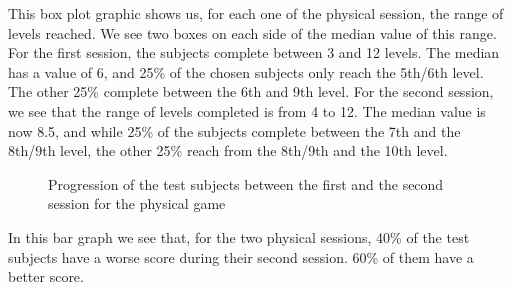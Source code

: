 \documentclass[12pt, openany, twocolumn]{article}
\begin{document}
            This box plot graphic shows us, for each one of the physical session, the range of levels reached. We see two boxes on each side of the median value of this range.
            For the first session, the subjects complete between 3 and 12 levels. The median has a value of 6, and 25\% of the chosen subjects only reach the 5th/6th level. The other 25\% complete between the 6th and 9th level.
            For the second session, we see that the range of levels completed is from 4 to 12. The median value is now 8.5, and while 25\% of the subjects complete between the 7th and the 8th/9th level, the other 25\% reach from the 8th/9th and the 10th level.
                
                \begin{figure}[H]
                    \setlength{\fboxsep}{0pt}
                    \setlength{\fboxrule}{1pt}
                    \caption{Progression of the test subjects between the first and the second session for the physical game}
                \end{figure}

            In this bar graph we see that, for the two physical sessions, 40\% of the test subjects have a worse score during their second session.
            60\% of them have a better score.
            \\
\end{document}
